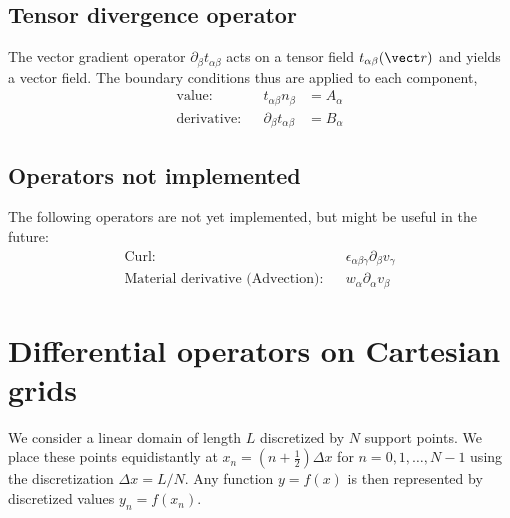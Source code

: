 \documentclass[
	superscriptaddress,
	twocolumn,
	aps, pre
]{revtex4-1}
\newcommand{\dx}{\Delta x}
\begin{document}
\subsection{Tensor divergence operator}
The vector gradient  operator $\partial_\beta t_{\alpha\beta}$ acts on a tensor field $t_{\alpha\beta}(\vect r)$ and yields a vector field.
The boundary conditions thus are applied to each component,
\begin{subequations}
\begin{align}
	\text{value:} &&	t_{\alpha\beta} n_\beta  &= A_\alpha
\\
	\text{derivative:} &&\partial_\beta t_{\alpha\beta}&= B_\alpha
\end{align}
\end{subequations}

\subsection{Operators not implemented}
The following operators are not yet implemented, but might be useful in the future:
\begin{subequations}
\begin{align}
	\text{Curl:} &&
		\epsilon_{\alpha\beta\gamma} \partial_\beta v_\gamma
\\
	\text{Material derivative (Advection):}&&
		w_\alpha \partial_\alpha v_\beta
\end{align} 
\end{subequations}





\section{Differential operators on Cartesian grids}
We consider a linear domain of length $L$ discretized by $N$ support points.
We place these points equidistantly at $x_n = (n+\frac12)\dx$ for $n=0,1,\ldots, N-1$ using the discretization $\dx=L/N$.
Any function $y=f(x)$ is then represented by discretized values $y_n = f(x_n)$.
\end{document}
